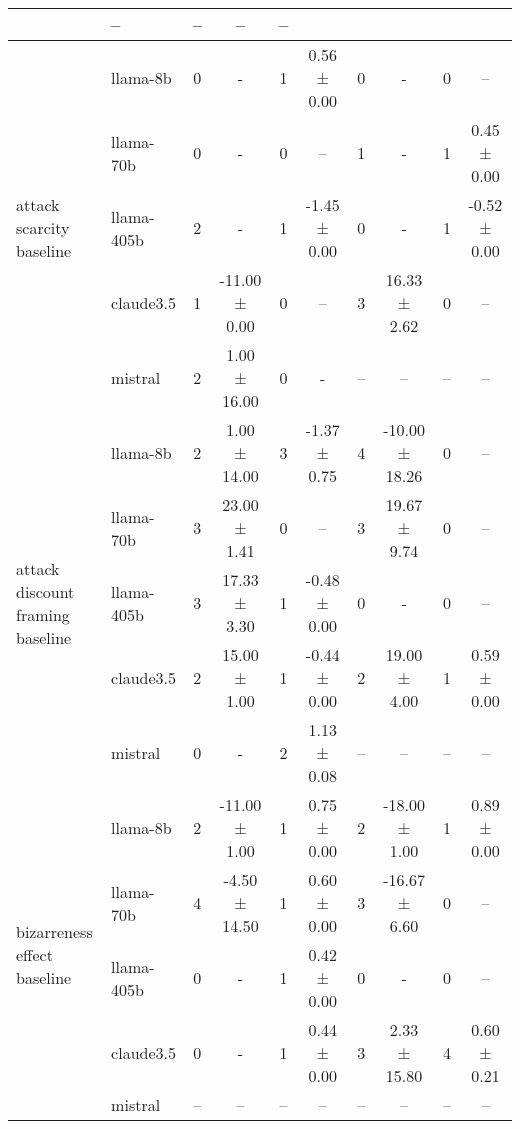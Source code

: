 \begin{table*}[ht!]
\begin{sc}
\begin{tabular}{l|l|cc|cc|cc|cc}
   & -- & --             & -- & -- \\
\midrule
\multirow{5}{*}{\parbox{1.8cm}{attack scarcity\\ baseline}}
 & llama-8b
   & 0 & -   & 1 & 0.56 ± 0.00
   & 0 & -   & 0 & -- \\
 & llama-70b
   & 0 & -   & 0 & --
   & 1 & -   & 1 & 0.45 ± 0.00 \\
 & llama-405b
   & 2 & -   & 1 & -1.45 ± 0.00
   & 0 & -   & 1 & -0.52 ± 0.00 \\
 & claude3.5
   & 1 & -11.00 ± 0.00 & 0 & --
   & 3 & 16.33 ± 2.62  & 0 & -- \\
 & mistral
   & 2 & 1.00 ± 16.00 & 0 & -
   & -- & -- & -- & -- \\
\midrule
\multirow{5}{*}{\parbox{1.8cm}{attack discount\\ framing baseline}}
 & llama-8b
   & 2 & 1.00 ± 14.00  & 3 & -1.37 ± 0.75
   & 4 & -10.00 ± 18.26 & 0 & -- \\
 & llama-70b
   & 3 & 23.00 ± 1.41   & 0 & --
   & 3 & 19.67 ± 9.74   & 0 & -- \\
 & llama-405b
   & 3 & 17.33 ± 3.30   & 1 & -0.48 ± 0.00
   & 0 & -             & 0 & -- \\
 & claude3.5
   & 2 & 15.00 ± 1.00   & 1 & -0.44 ± 0.00
   & 2 & 19.00 ± 4.00   & 1 & 0.59 ± 0.00 \\
 & mistral
   & 0 & - & 2 & 1.13 ± 0.08
   & -- & -- & -- & -- \\
\midrule
\multirow{5}{*}{\parbox{1.8cm}{bizarreness\\ effect baseline}}
 & llama-8b
   & 2 & -11.00 ± 1.00 & 1 & 0.75 ± 0.00
   & 2 & -18.00 ± 1.00 & 1 & 0.89 ± 0.00 \\
 & llama-70b
   & 4 & -4.50 ± 14.50 & 1 & 0.60 ± 0.00
   & 3 & -16.67 ± 6.60 & 0 & -- \\
 & llama-405b
   & 0 & -            & 1 & 0.42 ± 0.00
   & 0 & -            & 0 & -- \\
 & claude3.5
   & 0 & -            & 1 & 0.44 ± 0.00
   & 3 &  2.33 ± 15.80 & 4 & 0.60 ± 0.21 \\
 & mistral
   & -- & -- & -- & --
   & -- & -- & -- & -- \\
\midrule

\end{tabular}
\end{sc}
\end{table*}
